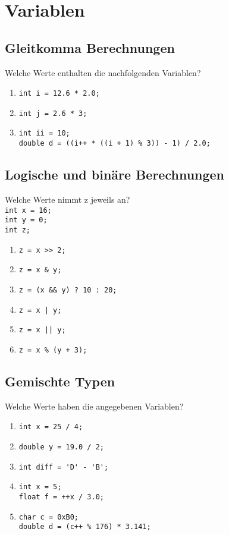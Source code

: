 \documentclass[]{scrartcl}
\begin{document}
\section{Variablen}

\subsection{Gleitkomma Berechnungen}
Welche Werte enthalten die nachfolgenden Variablen?

\begin{enumerate}[{1)}]
	\item \lstinline|int i = 12.6 * 2.0;|
	\item \lstinline|int j = 2.6 * 3;|
	\item \lstinline|int ii = 10;|\\
	\lstinline|double d = ((i++ * ((i + 1) % 3)) - 1) / 2.0;|
\end{enumerate}

\subsection{Logische und binäre Berechnungen}
Welche Werte nimmt z jeweils an?\\
\lstinline|int x = 16;|\\
\lstinline|int y = 0;|\\
\lstinline|int z;|

\begin{enumerate}[{1)}]
	\item \lstinline|z = x >> 2;|
	\item \lstinline|z = x & y;|
	\item \lstinline|z = (x && y) ? 10 : 20;|
	\item \lstinline{z = x | y;}
	\item \lstinline{z = x || y;}
	\item \lstinline|z = x % (y + 3);|
\end{enumerate}

\subsection{Gemischte Typen}
Welche Werte haben die angegebenen Variablen?\\

\begin{enumerate}[{1)}]
	\item \lstinline|int x = 25 / 4;|
	\item \lstinline|double y = 19.0 / 2;|
	\item \lstinline|int diff = 'D' - 'B';|
	\item \lstinline|int x = 5;|\\
	\lstinline|float f = ++x / 3.0;|
	\item \lstinline|char c = 0xB0;|\\
	\lstinline|double d = (c++ % 176) * 3.141;|
\end{enumerate}
\end{document}
